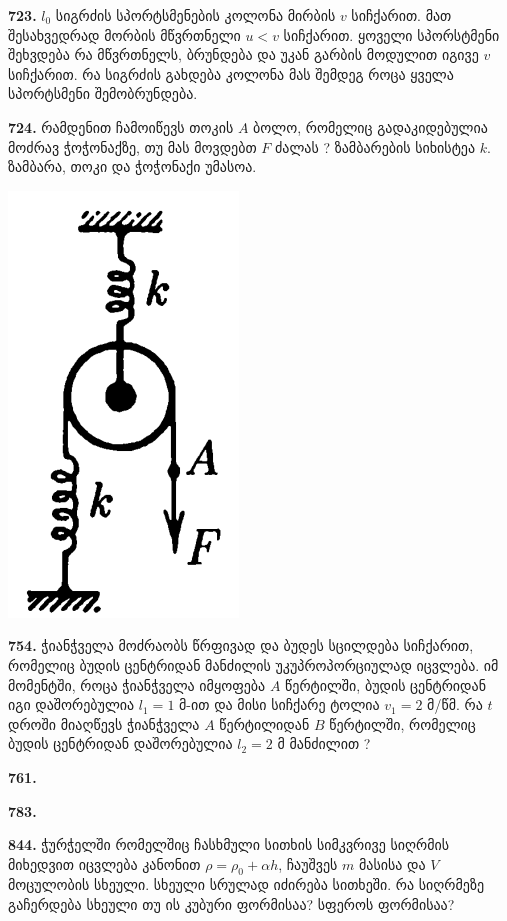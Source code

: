\documentclass[12pt,a4paper,]{report}
\begin{document}
\textbf{723.} $l_0$ სიგრძის სპორტსმენების კოლონა მირბის $v$ სიჩქარით. მათ შესახვედრად მორბის მწვრთნელი $u<v$ სიჩქარით. ყოველი სპორსტმენი შეხვდება რა მწვრთნელს, ბრუნდება და უკან გარბის მოდულით იგივე $v$ სიჩქარით. რა სიგრძის გახდება კოლონა მას შემდეგ როცა ყველა სპორტსმენი შემობრუნდება.
		
\textbf{724.} რამდენით ჩამოიწევს თოკის $A$ ბოლო, რომელიც გადაკიდებულია მოძრავ ჭოჭონაქზე, თუ მას მოვდებთ $F$ ძალას ? ზამბარების სიხისტეა $k$. ზამბარა, თოკი და ჭოჭონაქი უმასოა.
		\begin{center}
			\includegraphics[scale=0.3]{images/724.png}
		\end{center}

\textbf{754.} ჭიანჭველა მოძრაობს წრფივად და ბუდეს სცილდება სიჩქარით, რომელიც ბუდის ცენტრიდან მანძილის უკუპროპორციულად იცვლება. იმ მომენტში, როცა ჭიანჭველა იმყოფება $A$ წერტილში, ბუდის ცენტრიდან იგი დაშორებულია $l_1=1$ მ-ით და მისი სიჩქარე ტოლია  $v_1=2$ მ/წმ. რა $t$ დროში მიაღწევს ჭიანჭველა $A$ წერტილიდან $B$ წერტილში, რომელიც ბუდის ცენტრიდან დაშორებულია $l_2=2$ მ მანძილით ? 

\textbf{761.} 

\textbf{783.} 

\textbf{844.} ჭურჭელში რომელშიც ჩასხმული სითხის სიმკვრივე სიღრმის მიხედვით იცვლება კანონით $\rho=\rho_0+\alpha h$, ჩაუშვეს $m$ მასისა და $V$ მოცულობის სხეული. სხეული სრულად იძირება სითხეში. რა სიღრმეზე გაჩერდება სხეული თუ ის კუბური ფორმისაა? სფეროს ფორმისაა?
\end{document}
